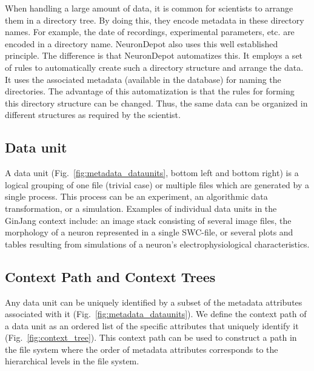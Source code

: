 \documentclass{frontiersSCNS} %
\begin{document}
When handling a large amount of data, it is common for scientists to arrange
them in a directory tree. By doing this, they encode metadata in these
directory names. For example, the date of recordings, experimental parameters,
etc. are encoded in a directory name. NeuronDepot also uses this well
established principle. The difference is that NeuronDepot automatizes this. It
employs a set of rules to automatically create such a directory structure and
arrange the data. It uses the associated metadata (available in the database)
for naming the directories. The advantage of this automatization is that the
rules for forming this directory structure can be changed. Thus, the same data
can be organized in different structures as required by the scientist.

\subsection{Data unit}

A data unit (Fig.~\ref{fig:metadata_dataunits}, bottom left and bottom right)
is a logical grouping of one file (trivial case) or multiple files which are
generated by a single process. This process can be an experiment, an
algorithmic data transformation, or a simulation. Examples of individual data
units in the GinJang context include: an image stack consisting of several
image files, the morphology of a neuron represented in a single SWC-file, or
several plots and tables resulting from simulations of a neuron's
electrophysiological characteristics.

\subsection{Context Path and Context Trees}

Any data unit can be uniquely identified by a subset of the metadata attributes
associated with it (Fig.~\ref{fig:metadata_dataunits}). We define the context
path of a data unit as an ordered list of the specific attributes that uniquely
identify it (Fig.~\ref{fig:context_tree}). This context path can be used to
construct a path in the file system where the order of metadata attributes
corresponds to the hierarchical levels in the file system.
\end{document}
